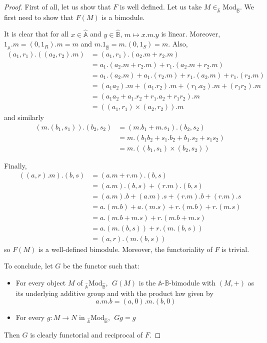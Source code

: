 \documentclass[a4paper,fleqn]{cas-sc}
\newcommand{\bA}{\mathbb{A}}
\newcommand{\bB}{\mathbb{B}}
\newcommand{\qmod}{\mathrm{Mod}}
\begin{document}
\begin{proof}
First of all, let us show that $F$ is well defined. Let us take $M \in _{\widehat{\bA}} \qmod _{\widehat{\bB}}$. We first need to show that $F(M)$ is a bimodule. 

It is clear that for all $x \in \widehat{\bA}$ and $y \in \widehat{\bB}$, $m \mapsto x.m.y$ is linear. 
Moreover, $1_{\widehat{\bA}}.m = (0,1_R).m = m$ and $m.1_{\widehat{\bB}} = m.(0, 1_S) = m$. 
Also, 
\begin{align*}
(a_1,r_1).((a_2,r_2).m )  &= (a_1,r_1).( a_2.m + r_2.m)
\\&= a_1.( a_2.m + r_2.m) +r_1. ( a_2.m + r_2.m)
\\&= a_1.(a_2.m) + a_1.(r_2.m) + r_1.(a_2.m) + r_1.(r_2.m)
\\&= (a_1 a_2) .m + (a_1.r_2).m + (r_1.a_2) .m + (r_1 r_2).m
\\&= (a_1 a_2 + a_1.r_2 + r_1.a_2 + r_1 r_2).m
\\&= ((a_1,r_1)\times (a_2,r_2)).m 
\end{align*}
\noindent and similarly
\begin{align*}
(m.(b_1, s_1)).(b_2, s_2)
&=(m.b_1 + m.s_1).(b_2, s_2)
\\&= m.(b_1 b_2 + s_1 .b_2 + b_1 .s_2 + s_1 s_2)
\\&= m.( (b_1, s_1) \times (b_2, s_2))
\end{align*}

Finally, 
\begin{align*}
((a, r).m).(b,s)
&=(a.m + r.m).(b, s)
\\&= (a.m).(b,s) + (r.m).(b,s)
\\&= (a.m).b + (a.m).s + (r.m).b + (r.m).s
\\&= a.(m.b) + a.(m.s) + r.(m.b) + r.(m.s)
\\&= a.(m.b + m.s) + r.(m.b + m.s)
\\&= a.(m.(b,s)) + r.(m.(b,s))
\\&= (a,r).(m.(b,s))
\end{align*}
\noindent so $F(M)$ is a well-defined bimodule.
Moreover, the functoriality of $F$ is trivial.

To conclude, let $G$ be the functor such that:
\begin{itemize}
    \item For every object $M$ of $_{\widehat{\bA}} \qmod _{\widehat{\bB}}$,   $\; G(M)$ is the $\bA$-$\bB$-bimodule with $(M,+)$ as its underlying additive group and with the product law given by $$a.m.b = (a,0).m.(b,0)$$ %
        \item For every $g : M \to N$ in $_{\widehat{\bA}} \qmod _{\widehat{\bB}}$,   $\; Gg = g$
\end{itemize}

Then $G$ is clearly functorial and reciprocal of $F$.
\end{proof}
\end{document}
